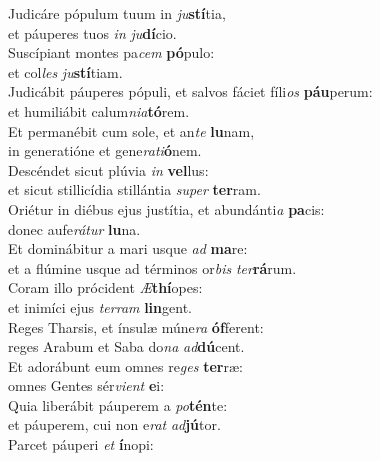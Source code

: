 \evenverse Judicáre pópulum tuum in \textit{ju}\textbf{stí}tia,~\*\\
\evenverse et páuperes tuos \textit{in} \textit{ju}\textbf{dí}cio.\\
\oddverse Suscípiant montes pa\textit{cem} \textbf{pó}pulo:~\*\\
\oddverse et col\textit{les} \textit{ju}\textbf{stí}tiam.\\
\evenverse Judicábit páuperes pópuli, et salvos fáciet fíli\textit{os} \textbf{páu}perum:~\*\\
\evenverse et humiliábit calum\textit{ni}\textit{a}\textbf{tó}rem.\\
\oddverse Et permanébit cum sole, et an\textit{te} \textbf{lu}nam,~\*\\
\oddverse in generatióne et gene\textit{ra}\textit{ti}\textbf{ó}nem.\\
\evenverse Descéndet sicut plúvia \textit{in} \textbf{vel}lus:~\*\\
\evenverse et sicut stillicídia stillántia \textit{su}\textit{per} \textbf{ter}ram.\\
\oddverse Oriétur in diébus ejus justítia, et abundánti\textit{a} \textbf{pa}cis:~\*\\
\oddverse donec aufe\textit{rá}\textit{tur} \textbf{lu}na.\\
\evenverse Et dominábitur a mari usque \textit{ad} \textbf{ma}re:~\*\\
\evenverse et a flúmine usque ad términos or\textit{bis} \textit{ter}\textbf{rá}rum.\\
\oddverse Coram illo prócident \textit{Æ}\textbf{thí}opes:~\*\\
\oddverse et inimíci ejus \textit{ter}\textit{ram} \textbf{lin}gent.\\
\evenverse Reges Tharsis, et ínsulæ múne\textit{ra} \textbf{óf}ferent:~\*\\
\evenverse reges Arabum et Saba do\textit{na} \textit{ad}\textbf{dú}cent.\\
\oddverse Et adorábunt eum omnes re\textit{ges} \textbf{ter}ræ:~\*\\
\oddverse omnes Gentes sér\textit{vi}\textit{ent} \textbf{e}i:\\
\evenverse Quia liberábit páuperem a \textit{po}\textbf{tén}te:~\*\\
\evenverse et páuperem, cui non e\textit{rat} \textit{ad}\textbf{jú}tor.\\
\oddverse Parcet páuperi \textit{et} \textbf{í}nopi:~\*\\
